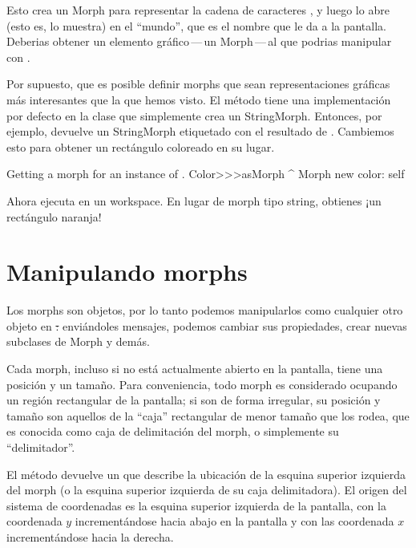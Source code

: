 \documentclass[a4paper,10pt,twoside]{book}
\begin{document}
Esto crea un Morph para representar la cadena de caracteres , y luego lo abre (esto es, lo muestra) en el ``mundo'', que es el nombre que \pharo le da a la pantalla.
Deberias obtener un elemento gráfico\,---\,un Morph\,---\,al que podrias manipular con \metaclick.

Por supuesto, que es posible definir morphs que sean representaciones gr\'aficas  m\'as interesantes que la que hemos visto.
El m\'etodo  tiene una implementaci\'on por defecto en la clase   que simplemente crea un StringMorph.
Entonces, por ejemplo,  devuelve un StringMorph etiquetado con el resultado de  .
Cambiemos esto para obtener un rect\'angulo coloreado en su lugar.


\begin{method}{Getting a morph for an instance of .}
Color>>>asMorph
	^ Morph new color: self
\end{method}
\noindent
Ahora ejecuta   en un workspace. En lugar de morph tipo string, obtienes ¡un rect\'angulo naranja!



\section{Manipulando morphs}

Los morphs son objetos, por lo tanto podemos manipularlos como cualquier otro objeto en \st: envi\'andoles mensajes, podemos cambiar sus propiedades, crear nuevas subclases de Morph y demás.

Cada morph, incluso si no est\'a actualmente abierto en la pantalla, tiene una posición y un tama\~no.
Para conveniencia, todo morph es considerado ocupando un regi\'on rectangular de la pantalla; si son de forma irregular, su posici\'on y tama\~no son aquellos de la ``caja'' rectangular de menor tama\~no que los rodea, que es conocida como caja de delimitaci\'on del morph, o simplemente su ``delimitador''.


El método  devuelve un  que describe la ubicaci\'on de la esquina superior izquierda del morph  (o la esquina superior izquierda de su caja delimitadora).
El origen del sistema de coordenadas es la esquina superior izquierda de la pantalla, con la coordenada $y$  increment\'andose hacia abajo en la pantalla y con las coordenada $x$ increment\'andose hacia la derecha.
\end{document}
